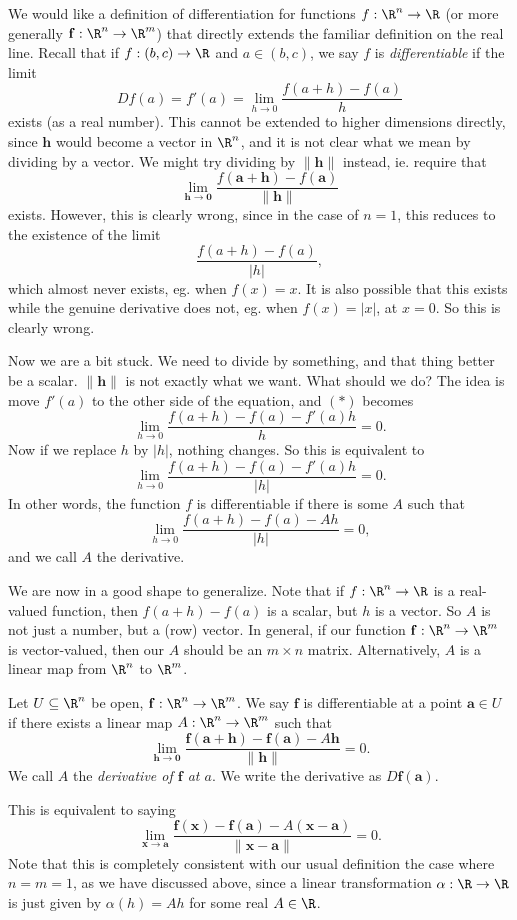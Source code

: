 \documentclass[a4paper]{article}
\begin{document}
We would like a definition of differentiation for functions $f: \R^n \to \R$ (or more generally $\mathbf{f}: \R^n \to \R^m$) that directly extends the familiar definition on the real line. Recall that if $f: (b, c) \to \R$ and $a \in (b, c)$, we say $f$ is \emph{differentiable} if the limit
\[
  Df(a) = f'(a) = \lim_{h \to 0} \frac{f(a + h) - f(a)}{h}\tag{$*$}
\]
exists (as a real number). This cannot be extended to higher dimensions directly, since $\mathbf{h}$ would become a vector in $\R^n$, and it is not clear what we mean by dividing by a vector. We might try dividing by $\|\mathbf{h}\|$ instead, ie. require that
\[
  \lim_{\mathbf{h}\to \mathbf{0}}\frac{f(\mathbf{a} + \mathbf{h}) - f(\mathbf{a})}{\|\mathbf{h}\|}
\]
exists. However, this is clearly wrong, since in the case of $n = 1$, this reduces to the existence of the limit
\[
  \frac{f(a + h) - f(a)}{|h|},
\]
which almost never exists, eg. when $f(x) = x$. It is also possible that this exists while the genuine derivative does not, eg. when $f(x) = |x|$, at $x = 0$. So this is clearly wrong.

Now we are a bit stuck. We need to divide by something, and that thing better be a scalar. $\|\mathbf{h}\|$ is not exactly what we want. What should we do? The idea is move $f'(a)$ to the other side of the equation, and $(*)$ becomes
\[
  \lim_{h \to 0} \frac{f(a + h) - f(a) - f'(a) h}{h} = 0.
\]
Now if we replace $h$ by $|h|$, nothing changes. So this is equivalent to
\[
  \lim_{h \to 0} \frac{f(a + h) - f(a) - f'(a) h}{|h|} = 0.
\]
In other words, the function $f$ is differentiable if there is some $A$ such that
\[
  \lim_{h \to 0} \frac{f(a + h) - f(a) - A h}{|h|} = 0,
\]
and we call $A$ the derivative.

We are now in a good shape to generalize. Note that if $f: \R^n \to \R$ is a real-valued function, then $f(a + h) - f(a)$ is a scalar, but $h$ is a vector. So $A$ is not just a number, but a (row) vector. In general, if our function $\mathbf{f}: \R^n \to \R^m$ is vector-valued, then our $A$ should be an $m \times n$ matrix. Alternatively, $A$ is a linear map from $\R^n$ to $\R^m$.

\begin{defi}[Differentiation in $\R^n$]
  Let $U\subseteq \R^n$ be open, $\mathbf{f}: \R^n \to \R^m$. We say $\mathbf{f}$ is differentiable at a point $\mathbf{a} \in U$ if there exists a linear map $A: \R^n \to \R^m$ such that
  \[
    \lim_{\mathbf{h} \to \mathbf{0}} \frac{\mathbf{f}(\mathbf{a} + \mathbf{h}) - \mathbf{f}(\mathbf{a}) - A \mathbf{h}}{\|\mathbf{h}\|} = 0.
  \]
  We call $A$ the \emph{derivative of $\mathbf{f}$ at $a$}. We write the derivative as $D \mathbf{f}(\mathbf{a})$.
\end{defi}
This is equivalent to saying
\[
  \lim_{\mathbf{x} \to \mathbf{a}} \frac{\mathbf{f}(\mathbf{x}) - \mathbf{f}(\mathbf{a}) - A (\mathbf{x} - \mathbf{a})}{\|\mathbf{x} - \mathbf{a}\|} = 0.
\]
Note that this is completely consistent with our usual definition the case where $n = m = 1$, as we have discussed above, since a linear transformation $\alpha: \R \to \R$ is just given by $\alpha(h) = Ah$ for some real $A \in \R$.
\end{document}
